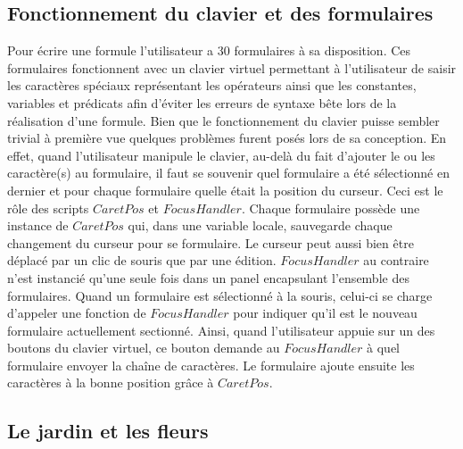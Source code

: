 \subsection{Fonctionnement du clavier et des formulaires}

Pour écrire une formule l'utilisateur a 30 formulaires à sa disposition. Ces formulaires fonctionnent avec un clavier virtuel permettant à l'utilisateur de saisir les caractères spéciaux représentant les opérateurs ainsi que les constantes, variables et prédicats afin d'éviter les erreurs de syntaxe bête lors de la réalisation d'une formule. Bien que le fonctionnement du clavier puisse sembler trivial à première vue quelques problèmes furent posés lors de sa conception. En effet, quand l'utilisateur manipule le clavier, au-delà du fait d'ajouter le ou les caractère(s) au formulaire, il faut se souvenir quel formulaire a été sélectionné en dernier et pour chaque formulaire quelle était la position du curseur. Ceci est le rôle des scripts $CaretPos$ et $FocusHandler$. Chaque formulaire possède une instance de $CaretPos$ qui, dans une variable locale, sauvegarde chaque changement du curseur pour se formulaire. Le curseur peut aussi bien être déplacé par un clic de souris que par une édition. $FocusHandler$ au contraire n'est instancié qu'une seule fois dans un panel encapsulant l'ensemble des formulaires. Quand un formulaire est sélectionné à la souris, celui-ci se charge d'appeler une fonction de $FocusHandler$ pour indiquer qu'il est le nouveau formulaire actuellement sectionné. Ainsi, quand l'utilisateur appuie sur un des boutons du clavier virtuel, ce bouton demande au $FocusHandler$ à quel formulaire envoyer la chaîne de caractères. Le formulaire ajoute ensuite les caractères à la bonne position grâce à $CaretPos$.

\subsection{Le jardin et les fleurs}

